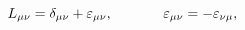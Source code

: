 \begin{equation}
L_{\mu \nu }=\delta _{\mu \nu }+\varepsilon _{\mu \nu } ,
\hspace{0.5in} \varepsilon _{\mu \nu }=-\varepsilon _{\nu \mu } ,
\label{44}
\end{equation}

